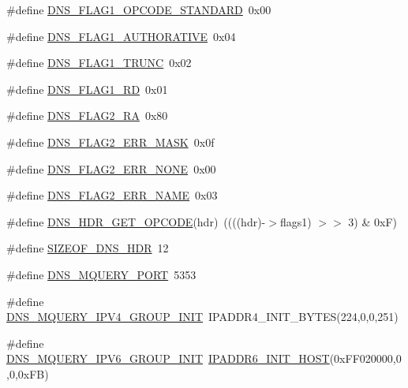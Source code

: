 \begin{DoxyCompactItemize}
\item 
\#define \hyperlink{openmote-cc2538_2lwip_2src_2include_2lwip_2prot_2dns_8h_a6a327c0ffd40f69fbcd5f01f12e5745c}{D\+N\+S\+\_\+\+F\+L\+A\+G1\+\_\+\+O\+P\+C\+O\+D\+E\+\_\+\+S\+T\+A\+N\+D\+A\+RD}~0x00
\item 
\#define \hyperlink{openmote-cc2538_2lwip_2src_2include_2lwip_2prot_2dns_8h_add685a0f8b5e76a2687cc0f306813bfb}{D\+N\+S\+\_\+\+F\+L\+A\+G1\+\_\+\+A\+U\+T\+H\+O\+R\+A\+T\+I\+VE}~0x04
\item 
\#define \hyperlink{openmote-cc2538_2lwip_2src_2include_2lwip_2prot_2dns_8h_a2e52037249bb98d7bbecf42e275beb07}{D\+N\+S\+\_\+\+F\+L\+A\+G1\+\_\+\+T\+R\+U\+NC}~0x02
\item 
\#define \hyperlink{openmote-cc2538_2lwip_2src_2include_2lwip_2prot_2dns_8h_a72d99b1623afa14bd58c667b748c2ddc}{D\+N\+S\+\_\+\+F\+L\+A\+G1\+\_\+\+RD}~0x01
\item 
\#define \hyperlink{openmote-cc2538_2lwip_2src_2include_2lwip_2prot_2dns_8h_ac72f8777ccc45ae274449ea7a9f3de04}{D\+N\+S\+\_\+\+F\+L\+A\+G2\+\_\+\+RA}~0x80
\item 
\#define \hyperlink{openmote-cc2538_2lwip_2src_2include_2lwip_2prot_2dns_8h_a9f6c329c04baba17fe0f5b2a6597d713}{D\+N\+S\+\_\+\+F\+L\+A\+G2\+\_\+\+E\+R\+R\+\_\+\+M\+A\+SK}~0x0f
\item 
\#define \hyperlink{openmote-cc2538_2lwip_2src_2include_2lwip_2prot_2dns_8h_a6aaa9da3d0f8d4c0799516d46d939942}{D\+N\+S\+\_\+\+F\+L\+A\+G2\+\_\+\+E\+R\+R\+\_\+\+N\+O\+NE}~0x00
\item 
\#define \hyperlink{openmote-cc2538_2lwip_2src_2include_2lwip_2prot_2dns_8h_a8ee5e2c8e517d6e4f2198057f81e93c6}{D\+N\+S\+\_\+\+F\+L\+A\+G2\+\_\+\+E\+R\+R\+\_\+\+N\+A\+ME}~0x03
\item 
\#define \hyperlink{openmote-cc2538_2lwip_2src_2include_2lwip_2prot_2dns_8h_a8b3138fb652e7b2fcdf8c24d555188af}{D\+N\+S\+\_\+\+H\+D\+R\+\_\+\+G\+E\+T\+\_\+\+O\+P\+C\+O\+DE}(hdr)~((((hdr)-\/$>$flags1) $>$$>$ 3) \& 0x\+F)
\item 
\#define \hyperlink{openmote-cc2538_2lwip_2src_2include_2lwip_2prot_2dns_8h_a1ffff846513e2493ba915d8874c26476}{S\+I\+Z\+E\+O\+F\+\_\+\+D\+N\+S\+\_\+\+H\+DR}~12
\item 
\#define \hyperlink{openmote-cc2538_2lwip_2src_2include_2lwip_2prot_2dns_8h_a62d67af5ac6c6b3f98a6566a42564276}{D\+N\+S\+\_\+\+M\+Q\+U\+E\+R\+Y\+\_\+\+P\+O\+RT}~5353
\item 
\#define \hyperlink{openmote-cc2538_2lwip_2src_2include_2lwip_2prot_2dns_8h_a861fa0ab623ace9086f5c7247a9f04c8}{D\+N\+S\+\_\+\+M\+Q\+U\+E\+R\+Y\+\_\+\+I\+P\+V4\+\_\+\+G\+R\+O\+U\+P\+\_\+\+I\+N\+IT}~I\+P\+A\+D\+D\+R4\+\_\+\+I\+N\+I\+T\+\_\+\+B\+Y\+T\+ES(224,0,0,251)
\item 
\#define \hyperlink{openmote-cc2538_2lwip_2src_2include_2lwip_2prot_2dns_8h_ae8c419a73ada8ec6b470b3679ae87b8e}{D\+N\+S\+\_\+\+M\+Q\+U\+E\+R\+Y\+\_\+\+I\+P\+V6\+\_\+\+G\+R\+O\+U\+P\+\_\+\+I\+N\+IT}~\hyperlink{openmote-cc2538_2lwip_2src_2include_2lwip_2ip__addr_8h_adaff748da2b808995993dd3db5420f08}{I\+P\+A\+D\+D\+R6\+\_\+\+I\+N\+I\+T\+\_\+\+H\+O\+ST}(0x\+F\+F020000,0,0,0x\+F\+B)
\end{DoxyCompactItemize}
